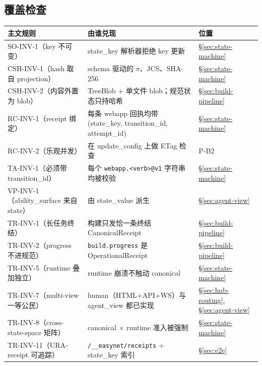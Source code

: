 \documentclass[11pt,a4paper]{article}
\theoremstyle{definition}
\begin{document}
\subsection{覆盖检查}

\begin{center}
\renewcommand{\arraystretch}{1.2}
\begin{tabularx}{\linewidth}{l X l}
\toprule
\textbf{主文规则} & \textbf{由谁兑现} & \textbf{位置} \\
\midrule
SO-INV-1（key 不可变）                   & state\_key 解析器拒绝 key 更新                          & \S\ref{sec:state-machine} \\
CSH-INV-1（hash 取自 projection）       & schema 驱动的 $\pi$、JCS、SHA-256                          & \S\ref{sec:state-machine} \\
CSH-INV-2（内容外置为 blob）             & TreeBlob + 单文件 blob；规范状态只持哈希                 & \S\ref{sec:build-pipeline} \\
RC-INV-1（receipt 绑定）                 & 每条 webapp 回执均带 (state\_key, transition\_id, attempt\_id) & \S\ref{sec:state-machine} \\
RC-INV-2（乐观并发）                    & 在 update\_config 上做 ETag 检查                          & P-B2 \\
TA-INV-1（必须带 transition\_id）        & 每个 \texttt{webapp.<verb>@v1} 字符串均被校验             & \S\ref{sec:state-machine} \\
VP-INV-1（ability\_surface 来自 state）  & 由 state\_value 派生                                      & \S\ref{sec:agent-view} \\
TR-INV-1（长任务终结）                  & 构建只发恰一条终结 CanonicalReceipt                       & \S\ref{sec:build-pipeline} \\
TR-INV-2（progress 不进规范）           & \texttt{build.progress} 是 OperationalReceipt              & \S\ref{sec:build-pipeline} \\
TR-INV-5（runtime 叠加独立）            & runtime 崩溃不触动 canonical                              & \S\ref{sec:state-machine} \\
TR-INV-7（multi-view 一等公民）          & human（HTML+API+WS）与 agent\_view 都已实现              & \S\ref{sec:hub-routing}, \S\ref{sec:agent-view} \\
TR-INV-8（cross-state-space 矩阵）       & canonical $\times$ runtime 准入被强制                    & \S\ref{sec:state-machine} \\
TR-INV-11（URA-receipt 可追踪）          & \texttt{/\_\_easynet/receipts} + state\_key 索引          & \S\ref{sec:e2e} \\

\end{tabularx}
\end{center}
\end{document}
